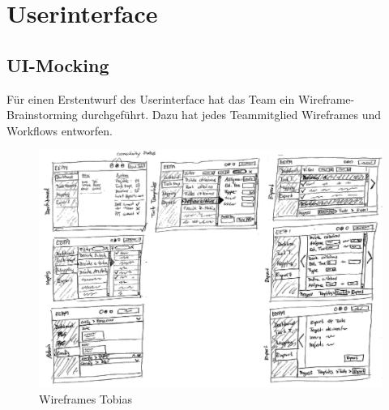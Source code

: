 \chapter{Userinterface}
	\section{UI-Mocking}
	
		Für einen Erstentwurf des Userinterface hat das Team ein Wireframe-Brainstorming durchgeführt.
		Dazu hat jedes Teammitglied Wireframes und Workflows entworfen.
	
		\begin{figure}[H]
			\includegraphics[width=\linewidth]{interfacesAndProtocols/media/img/wireframesTobias1.jpg}
			\centering
			\caption{Wireframes Tobias}
			\label{fig:wireframesTobias1}
		\end{figure}
		
